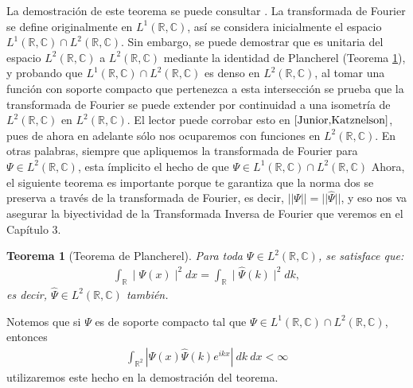 \documentclass[12pt]{article}
\newtheorem{teo}{Teorema}[section]
\theoremstyle{definition}
\newcommand*{\field}[1]{\mathbb{#1}}
\begin{document}
\noindent
La demostración de este teorema se puede consultar \cite[]{Iorio}. La transformada de Fourier se define originalmente en $L^1(\field{R},\field{C})$, así se considera inicialmente el espacio $L^1(\field{R},\field{C})\cap L^2(\field{R},\field{C})$. Sin embargo, se puede demostrar que es unitaria del espacio $L^{2}(\field{R},\field{C})$ a $L^{2}(\field{R},\field{C})$ mediante la identidad de Plancherel (Teorema \ref{teo:Plancherel}), y probando que $L^1(\field{R},\field{C})\cap L^2(\field{R},\field{C})$ es denso en $L^{2}(\field{R},\field{C})$, al tomar una función con soporte compacto que pertenezca a esta intersección se prueba que la transformada de Fourier se puede extender por continuidad a una isometría de $L^{2}(\field{R},\field{C})$ en $L^{2}(\field{R},\field{C})$. El lector puede corrobar esto en $\cite{Junior,Katznelson}$, pues de ahora en adelante sólo nos ocuparemos con funciones en $L^{2}(\field{R},\field{C})$. En otras palabras, siempre que apliquemos la transformada de Fourier para $\Psi\in L^{2}(\field{R},\field{C})$, esta ímplicito el hecho de que $\Psi\in L^1(\field{R},\field{C})\cap L^2(\field{R},\field{C})$   Ahora, el siguiente teorema es importante porque te garantiza que la norma dos se preserva a través de la transformada de Fourier, es decir, $||\Psi|| = ||\hat{\Psi}||$, y eso nos va asegurar la biyectividad de la Transformada Inversa de Fourier que veremos en el Capítulo 3. 
\begin{teo}[Teorema de Plancherel]
    Para toda $\Psi \in L^{2}(\field{R},\field{C})$, se satisface que:
    \begin{align*}
        \int_{\field{R}} \mid \Psi(x)\mid^2 dx = \int_{\field{R}} \mid \hat{\Psi}(k) \mid^2 dk,
    \end{align*}
    es decir, $\hat{\Psi}\in L^{2}(\field{R},\field{C})$ también.
    \label{teo:Plancherel}
\end{teo}
\noindent
Notemos que si $\Psi$ es de soporte compacto tal que $\Psi\in L^1(\field{R},\field{C})\cap L^2(\field{R},\field{C})$, entonces
\begin{align}
    \int_{\field{R}^2}|\Psi(x)\hat{\Psi}(k)e^{ikx}|\:dk\:dx < \infty
    \label{eq:finproducto}
\end{align}
utilizaremos este hecho en la demostración del teorema.
\end{document}
